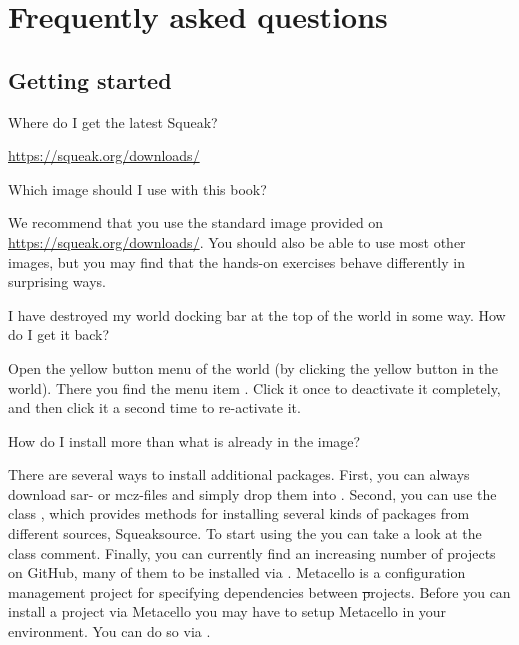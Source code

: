 \documentclass[a4paper,10pt,twoside]{book}
\begin{document}
	\renewcommand{\nnbb}[2]{} %
	\sloppy
\fi
\chapter{Frequently asked questions}
\label{app:faq}


\section{Getting started}
\begin{faq}
Where do I get the latest Squeak?
\end{faq}
\answer
\url{https://squeak.org/downloads/}

\begin{faq}
Which \sq image should I use with this book?
\end{faq}
\answer
We recommend that you use the standard image provided on \url{https://squeak.org/downloads/}.
You should also be able to use most other images, but you may find that the hands-on exercises behave differently in surprising ways.

\begin{faq}
I have destroyed my world docking bar at the top of the world in some way.
How do I get it back?
\end{faq}
\answer
Open the yellow button menu of the world (by clicking the yellow button in the world). 
There you find the menu item .
Click it once to deactivate it completely, and then click it a second time to re-activate it.

\begin{faq}
How do I install more than what is already in the image?
\end{faq}
\answer
There are several ways to install additional packages. 
First, you can always download sar- or mcz-files and simply drop them into \sq.
Second, you can use the class , which provides methods for installing several kinds of packages from different sources, \eg Squeaksource. 
To start using the  you can take a look at the class comment.
Finally, you can currently find an increasing number of \sq projects on GitHub, many of them to be installed via .
Metacello is a configuration management project for specifying dependencies between \st projects.
Before you can install a project via Metacello you may have to setup Metacello in your environment. 
You can do so via .
\end{document}
